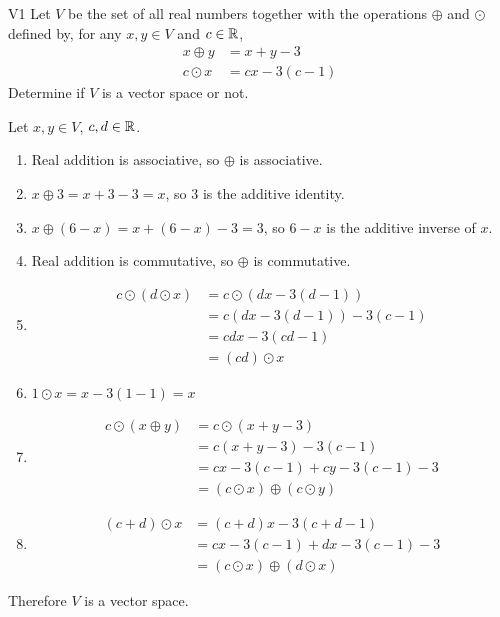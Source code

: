 \documentclass{sbgLAquiz}
\begin{document}
\begin{problem}{V1}
Let $V$ be the  set of all real numbers together with the operations $\oplus$ and $\odot$ defined by, for any $x,y \in V$ and $c \in \mathbb{R}$,
\begin{align*}
x\oplus y  &= x+y-3 \\
c \odot x &= cx-3(c-1)
\end{align*}
Determine if $V$ is a vector space or not.
\end{problem}

\begin{solution}
Let $x,y \in V$, $c,d \in \mathbb{R}$.
\begin{enumerate}[1)]
\item Real addition is associative, so $\oplus$ is associative.
\item $x\oplus 3 = x+3-3=x$, so $3$ is the additive identity.
\item $x \oplus (6-x) = x+(6-x)-3=3$, so $6-x$ is the additive inverse of $x$.
\item Real addition is commutative, so $\oplus$ is commutative.
\item \begin{align*}
c\odot \left( d \odot x\right) &= c\odot \left( dx-3(d-1) \right) \\
&= c\left(dx-3(d-1)\right)-3(c-1) \\
&= cdx-3(cd-1) \\
&= (cd) \odot x
\end{align*}
\item $1 \odot x = x-3(1-1)=x$
\item \begin{align*} c \odot (x \oplus y) &=
c \odot (x+y-3) \\
&= c(x+y-3)-3(c-1) \\
&= cx-3(c-1) + cy-3(c-1) -3 \\
&= (c\odot x ) \oplus (c\odot y)
\end{align*}
\item \begin{align*} (c+d) \odot x &= (c+d)x-3(c+d-1) \\
&= cx-3(c-1)+dx-3(c-1)-3 \\
&= (c\odot x ) \oplus (d \odot x)
\end{align*}
\end{enumerate}

Therefore $V$ is a vector space.
\end{solution}
\end{document}
